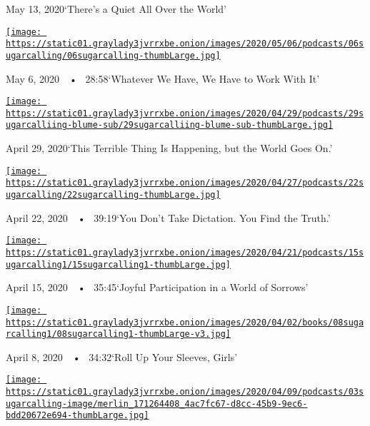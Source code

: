 May 13, 2020`There's a Quiet All Over the World'

\href{https://www.nytimes3xbfgragh.onion/2020/05/06/podcasts/sugar-calling-alice-walker-quarantine-virus.html?action=click\&module=audio-series-bar\&region=header\&pgtype=Article}{\texttt{[image: https://static01.graylady3jvrrxbe.onion/images/2020/05/06/podcasts/06sugarcalling/06sugarcalling-thumbLarge.jpg]}}

May 6, 2020~~•~ 28:58`Whatever We Have, We Have to Work With It'

\href{https://www.nytimes3xbfgragh.onion/2020/04/29/podcasts/sugar-calling-judy-blume-quarantine-virus.html?action=click\&module=audio-series-bar\&region=header\&pgtype=Article}{\texttt{[image: https://static01.graylady3jvrrxbe.onion/images/2020/04/29/podcasts/29sugarcalliing-blume-sub/29sugarcalliing-blume-sub-thumbLarge.jpg]}}

April 29, 2020`This Terrible Thing Is Happening, but the World Goes On.'

\href{https://www.nytimes3xbfgragh.onion/2020/04/22/podcasts/sugar-calling-amy-tan-quarantine-virus.html?action=click\&module=audio-series-bar\&region=header\&pgtype=Article}{\texttt{[image: https://static01.graylady3jvrrxbe.onion/images/2020/04/27/podcasts/22sugarcalling/22sugarcalling-thumbLarge.jpg]}}

April 22, 2020~~•~ 39:19`You Don't Take Dictation. You Find the Truth.'

\href{https://www.nytimes3xbfgragh.onion/2020/04/15/podcasts/sugar-calling-pico-iyer-coronavirus.html?action=click\&module=audio-series-bar\&region=header\&pgtype=Article}{\texttt{[image: https://static01.graylady3jvrrxbe.onion/images/2020/04/21/podcasts/15sugarcalling1/15sugarcalling1-thumbLarge.jpg]}}

April 15, 2020~~•~ 35:45`Joyful Participation in a World of Sorrows'

\href{https://www.nytimes3xbfgragh.onion/2020/04/08/podcasts/sugar-calling-margaret-atwood-coronavirus.html?action=click\&module=audio-series-bar\&region=header\&pgtype=Article}{\texttt{[image: https://static01.graylady3jvrrxbe.onion/images/2020/04/02/books/08sugarcalling1/08sugarcalling1-thumbLarge-v3.jpg]}}

April 8, 2020~~•~ 34:32`Roll Up Your Sleeves, Girls'

\href{https://www.nytimes3xbfgragh.onion/2020/04/03/podcasts/sugar-calling-george-saunders-coronavirus.html?action=click\&module=audio-series-bar\&region=header\&pgtype=Article}{\texttt{[image: https://static01.graylady3jvrrxbe.onion/images/2020/04/09/podcasts/03sugarcalling-image/merlin\_171264408\_4ac7fc67-d8cc-45b9-9ec6-bdd20672e694-thumbLarge.jpg]}}

